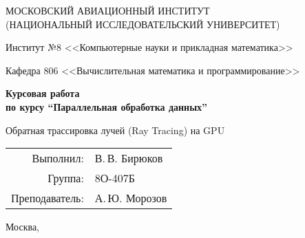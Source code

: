 \begin{titlepage}
\begin{center}
\large
МОСКОВСКИЙ АВИАЦИОННЫЙ ИНСТИТУТ\\ (НАЦИОНАЛЬНЫЙ ИССЛЕДОВАТЕЛЬСКИЙ УНИВЕРСИТЕТ)

\vspace{20pt}

Институт №8 <<Компьютерные науки и прикладная математика>>

Кафедра 806 <<Вычислительная математика и программирование>>
\end{center}

\vspace{60pt}

\begin{center}
\bfseries
\large
Курсовая работа \\по курсу \enquote{Параллельная обработка данных}

\vspace{54pt}

Обратная трассировка лучей (Ray Tracing) на GPU
\end{center}

\vfill

\begin{flushright}
\large
\begin{tabular}{rl}
Выполнил: & В.\,В. Бирюков \\
Группа: & 8О-407Б \\
Преподаватель: & А.\,Ю. Морозов \\
\end{tabular}
\end{flushright}

\vspace{92pt}

\begin{center}
\large
Москва, \the\year
\end{center}
\end{titlepage}

\pagebreak
